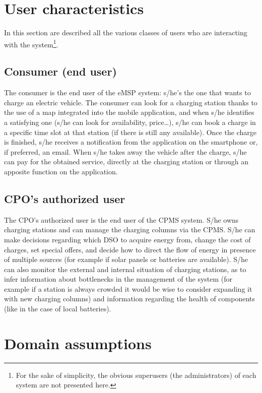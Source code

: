 \vfill
\pagebreak

\section{User characteristics} \label{users}

In this section are described all the various classes of users who are interacting with the system\footnote{For the sake of simplicity, the obvious superusers (the administrators) of each system are not presented here.}.

\subsection{Consumer (end user)}

The consumer is the end user of the eMSP system: s/he's the one that wants to charge an electric vehicle. The consumer can look for a charging station thanks to the use of a map integrated into the mobile application, and when s/he identifies a satisfying one (s/he can look for availability, price\dots), s/he can book a charge in a specific time slot at that station (if there is still any available). Once the charge is finished, s/he receives a notification from the application on the smartphone or, if preferred, an email. When s/he takes away the vehicle after the charge, s/he can pay for the obtained service, directly at the charging station or through an apposite function on the application.

\subsection{CPO's authorized user}

The CPO's authorized user is the end user of the CPMS system. S/he owns charging stations and can manage the charging columns via the CPMS. S/he can make decisions regarding which DSO to acquire energy from, change the cost of charges, set special offers, and decide how to direct the flow of energy in presence of multiple sources (for example if solar panels or batteries are available). S/he can also monitor the external and internal situation of charging stations, as to infer information about bottlenecks in the management of the system (for example if a station is always crowded it would be wise to consider expanding it with new charging columns) and information regarding the health of components (like in the case of local batteries).

\section{Domain assumptions}

